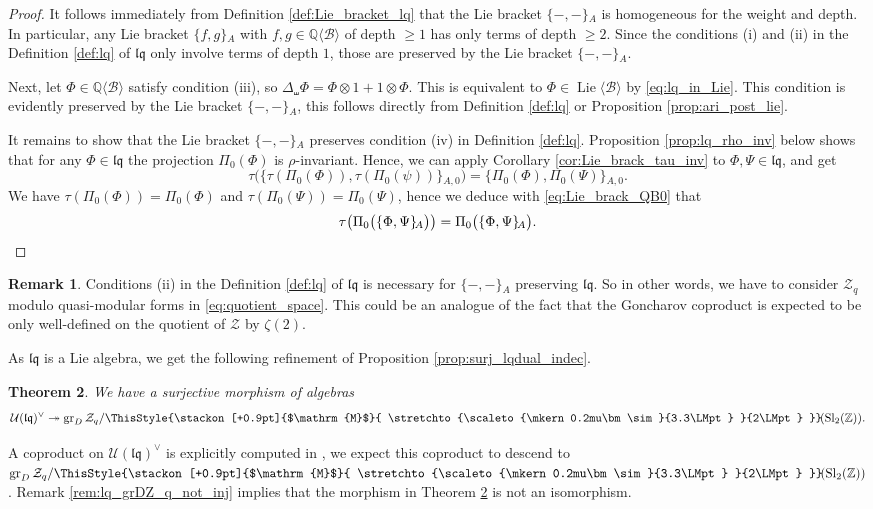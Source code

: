 \documentclass[12pt,reqno]{amsart}
\newtheorem{thm}{Theorem}[section]
\numberwithin{equation}{section}
\theoremstyle{definition}
\newtheorem{rem}[thm]{Remark}
\newcommand{\medtildeM}{ \ThisStyle{\stackon[+0.9pt]{$\mathrm{M}$}{ \stretchto{\scaleto{\mkern0.2mu\bm\sim}{3.3\LMpt} }{2\LMpt} }}}
\newcommand{\ZZ}{\mathbb{Z}}
\newcommand{\QQ}{\mathbb{Q}}
\newcommand{\quasimod}{\ensuremath{\medtildeM\!(\operatorname{Sl}_2(\ZZ))}}
\newcommand{\Z}{\mathcal{Z}}
\newcommand{\grDZ}{\operatorname{gr}_D\Z}
\newcommand{\B}{\mathcal{B}}
\newcommand{\QB}{\QQ\langle \B\rangle}
\newcommand{\LieB}{\operatorname{Lie}\langle \B\rangle}
\newcommand{\lqq}{\mathfrak{lq}}
\newcommand{\ariemp}{\{-,-\}\!_A}
\newcommand{\ari}[2]{\{#1,#2\}\!_A}
\newcommand{\arizero}[2]{\{#1,#2\}\!_{A,0}}
\newcommand{\shco}{\Delta_{\shuffle}}
\newcommand{\pizero}{\Pi_0}
\begin{document}
\begin{proof} 
It follows immediately from Definition \ref{def:Lie_bracket_lq} that the Lie bracket $\ariemp$ is homogeneous for the weight and depth. In particular, any Lie bracket $\ari{f}{g}$ with $f,g\in \QB$ of depth $\geq1$ has only terms of depth $\geq 2$. Since the conditions (i) and (ii) in the Definition \ref{def:lq} of $\lqq$ only involve terms of depth $1$, those are preserved by the Lie bracket $\ariemp$. 
	
Next, let $\Phi\in \QB$ satisfy condition (iii), so $\shco\Phi=\Phi\otimes 1+1\otimes\Phi$. This is equivalent to $\Phi\in \LieB$ by \eqref{eq:lq_in_Lie}. This condition is evidently preserved by the Lie bracket $\ariemp$, this follows directly from Definition \ref{def:lq} or Proposition \ref{prop:ari_post_lie}.

It remains to show that the Lie bracket $\ariemp$ preserves condition (iv) in Definition \ref{def:lq}. Proposition \ref{prop:lq_rho_inv} below shows that for any $\Phi\in \lqq$ the projection $\pizero(\Phi)$ is $\rho$-invariant. Hence, we can apply Corollary \ref{cor:Lie_brack_tau_inv} to $\Phi,\Psi\in \lqq$, and get
\[\tau\big(\arizero{\tau(\pizero(\Phi))}{\tau(\pizero(\psi))}\big)=\arizero{\pizero(\Phi)}{\pizero(\Psi)}.\]
We have $\tau(\pizero(\Phi))=\pizero(\Phi)$ and $\tau(\pizero(\Psi))=\pizero(\Psi)$, hence we deduce with \eqref{eq:Lie_brack_QB0} that
\[\tau\big(\pizero\big(\ari{\Phi}{\Psi}\big)\big)=\pizero\big(\ari{\Phi}{\Psi}\big).\qedhere\]
\end{proof}

\begin{rem} Conditions (ii) in the Definition \ref{def:lq} of $\lqq$ is necessary for $\ariemp$ preserving $\lqq$. So in other words, we have to consider $\Z_q$ modulo quasi-modular forms in \eqref{eq:quotient_space}. This could be an analogue of the fact that the Goncharov coproduct is expected to be only well-defined on the quotient of $\Z$  by $\zeta(2)$. 
\end{rem}

As $\lqq$ is a Lie algebra, we get the following refinement of Proposition \ref{prop:surj_lqdual_indec}.

\begin{thm} \label{thm:qmzv_depthgraded_surj} We have a surjective morphism of algebras
\[\mathcal{U}(\lqq)^\vee\twoheadrightarrow \grDZ_q/\quasimod.\]
\end{thm}

A coproduct on $\mathcal{U}(\lqq)^\vee$ is explicitly computed in \cite[Theorem 4.25]{BK25}, we expect this coproduct to descend to $\grDZ_q/\quasimod$. Remark \ref{rem:lq_grDZ_q_not_inj} implies that the morphism in Theorem \ref{thm:qmzv_depthgraded_surj} is not an isomorphism. 
\end{document}
